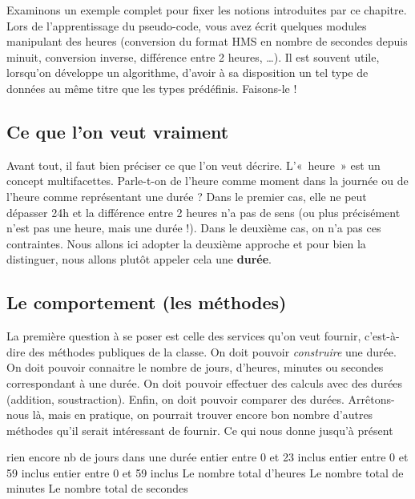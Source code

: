 	Examinons un exemple complet pour fixer les notions introduites par ce
	chapitre. Lors de l'apprentissage du pseudo-code, vous
	avez écrit quelques modules manipulant des heures (conversion du format
	HMS en nombre de secondes depuis minuit, conversion inverse, différence
	entre 2 heures, …). Il est souvent utile, lorsqu’on développe un
	algorithme, d’avoir à sa disposition un tel type de données au même
	titre que les types prédéfinis. Faisons-le !
	
	\subsection{Ce que l’on veut vraiment}
	
		Avant tout, il faut bien préciser ce que l’on veut décrire. L’«~heure~»
		est un concept multifacettes. Parle-t-on de l’heure comme moment dans
		la journée ou de l’heure comme représentant une durée ? Dans le premier
		cas, elle ne peut dépasser 24h et la différence entre 2 heures n’a pas
		de sens (ou plus précisément n’est pas une heure, mais une durée !).
		Dans le deuxième cas, on n’a pas ces contraintes. Nous allons ici
		adopter la deuxième approche et pour bien la distinguer, nous allons
		plutôt appeler cela une \textbf{durée}.
	
	\subsection{Le comportement (les méthodes)}
	
		La première question à se poser est celle des services qu’on veut
		fournir, c’est-à-dire des méthodes publiques de la classe. On doit
		pouvoir \textit{construire} une durée. On doit pouvoir connaitre le
		nombre de jours, d’heures, minutes ou secondes correspondant à une durée. On doit
		pouvoir effectuer des calculs avec des durées (addition, soustraction).
		Enfin, on doit pouvoir comparer des durées. Arrêtons-nous là, mais en
		pratique, on pourrait trouver encore bon nombre d’autres méthodes qu’il
		serait intéressant de fournir. Ce qui nous donne jusqu’à présent
		
		\begin{Pseudocode}
				\Private
					\LComment rien encore
				\Public
					\Empty
					\RComment nb de jours dans une durée
					\RComment entier entre 0 et 23 inclus
					\RComment entier entre 0 et 59 inclus
					\RComment entier entre 0 et 59 inclus
					\Empty
					\RComment Le nombre total d’heures
					\RComment Le nombre total de minutes
					\RComment Le nombre total de secondes
					\Empty
			\EndClass
		\end{Pseudocode}
		
